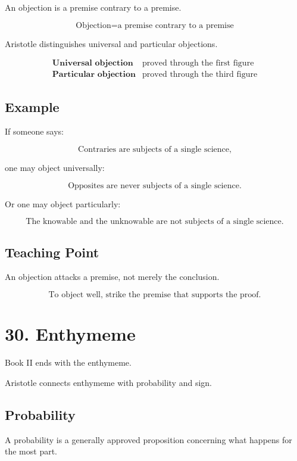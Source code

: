 \documentclass[12pt]{article}
\begin{document}
An objection is a premise contrary to a premise.

\[
\boxed{
\text{Objection} = \text{a premise contrary to a premise}
}
\]

Aristotle distinguishes universal and particular objections.

\[
\begin{array}{ll}
\textbf{Universal objection} & \text{proved through the first figure} \\
\textbf{Particular objection} & \text{proved through the third figure}
\end{array}
\]

\subsection*{Example}

If someone says:

\[
\text{Contraries are subjects of a single science,}
\]

one may object universally:

\[
\text{Opposites are never subjects of a single science.}
\]

Or one may object particularly:

\[
\text{The knowable and the unknowable are not subjects of a single science.}
\]

\subsection*{Teaching Point}

An objection attacks a premise, not merely the conclusion.

\[
\boxed{
\text{To object well, strike the premise that supports the proof.}
}
\]

\section*{30. Enthymeme}

Book II ends with the enthymeme.

Aristotle connects enthymeme with probability and sign.

\subsection*{Probability}

A probability is a generally approved proposition concerning what happens for
the most part.
\end{document}
